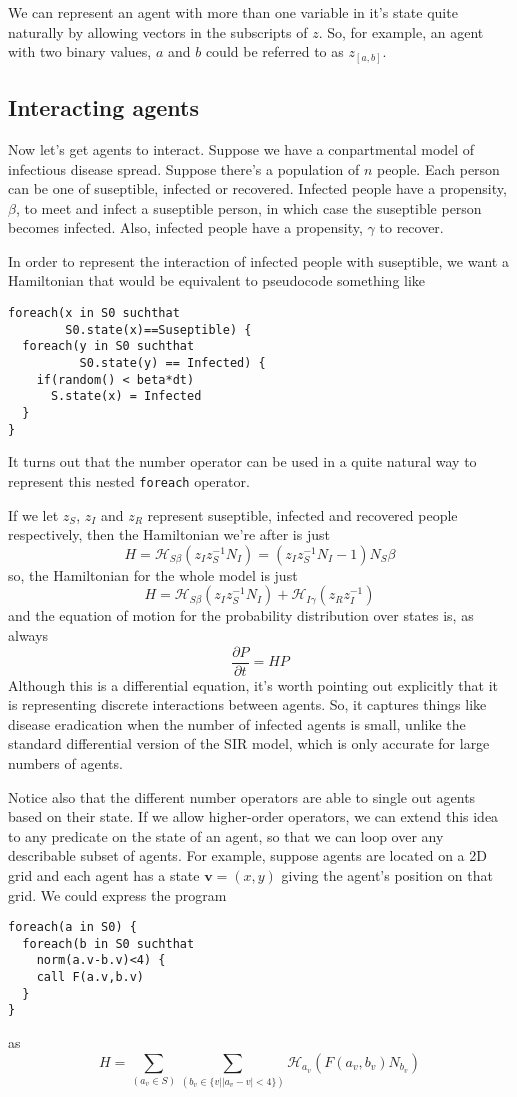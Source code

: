 \documentclass[letterpaper,twocolumn,10pt]{article}
\begin{document}
We can represent an agent with more than one variable in it's state quite naturally by allowing vectors in the subscripts of $z$. So, for example, an agent with two binary values, $a$ and $b$ could be referred to as $z_{[a,b]}$.

\subsection{Interacting agents}

Now let's get agents to interact. Suppose we have a conpartmental model of infectious disease spread. Suppose there's a population of $n$ people. Each person can be one of suseptible, infected or recovered. Infected people have a propensity, $\beta$, to meet and infect a suseptible person, in which case the suseptible person becomes infected. Also, infected people have a propensity, $\gamma$ to recover.

In order to represent the interaction of infected people with suseptible, we want a Hamiltonian that would be equivalent to pseudocode something like
\begin{verbatim}
foreach(x in S0 suchthat 
        S0.state(x)==Suseptible) {
  foreach(y in S0 suchthat
          S0.state(y) == Infected) {
    if(random() < beta*dt)
      S.state(x) = Infected
  }
}
\end{verbatim}

It turns out that the number operator can be used in a quite natural way to represent this nested \texttt{foreach} operator.

If we let $z_S$, $z_I$ and $z_R$ represent suseptible, infected and recovered people respectively, then the Hamiltonian we're after is just
\[
H = \mathcal{H}_{S\beta}(z_Iz_S^{-1}N_I) = (z_Iz_S^{-1}N_I - 1)N_S\beta
\]
so, the Hamiltonian for the whole model is just
\[
H = \mathcal{H}_{S\beta}(z_Iz_S^{-1}N_I) + \mathcal{H}_{I\gamma}(z_Rz_I^{-1})
\]
and the equation of motion for the probability distribution over states is, as always
\[
\frac{\partial P}{\partial t} = HP
\]
Although this is a differential equation, it's worth pointing out explicitly that it is representing discrete interactions between agents. So, it captures things like disease eradication when the number of infected agents is small, unlike the standard differential version of the SIR model, which is only accurate for large numbers of agents.

Notice also that the different number operators are able to single out agents based on their state. If we allow higher-order operators, we can extend this idea to any predicate on the state of an agent, so that we can loop over any describable subset of agents. For example, suppose agents are located on a 2D grid and each agent has a state $\mathbf{v} = (x,y)$ giving the agent's position on that grid. We could express the program
\begin{verbatim}
foreach(a in S0) {
  foreach(b in S0 suchthat 
    norm(a.v-b.v)<4) {
    call F(a.v,b.v)
  }
}
\end{verbatim}
as
\[
H = \sum_{(a_v\in S)}\sum_{(b_v\in \{v | |a_v-v| < 4\})} \mathcal{H}_{a_v}(F(a_v,b_v)N_{b_v})
\]
\end{document}
